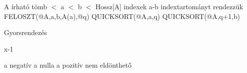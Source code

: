 \documentclass{article}
\begin{document}
\listofalgorithms

\begin{algorithm}
    \begin{algorithmic}[2]
            \Require A írható tömb
             $<$ a $<$ b $<$ Hossz[A] indexek
            \Ensure a-b indextartományt rendezzük
            \State {}  
            \Else
            \State FELOSZT(@A,a,b,A(a),@q) 
            \State QUICKSORT(@A,a,q)
            \State QUICKSORT(@A,q+1,b)
            \State {}
            \EndIf
        \EndProcedure
    \end{algorithmic}
    \caption{Gyorsrendezés}
\end{algorithm}

\begin{algorithmic}
    \Do
    \State x-1
\end{algorithmic}

\begin{algorithmic}
    \State a negatív
    \State a nulla
    \State a pozitív
    \Default
    \State nem eldönthető
\end{algorithmic}
\end{document}
